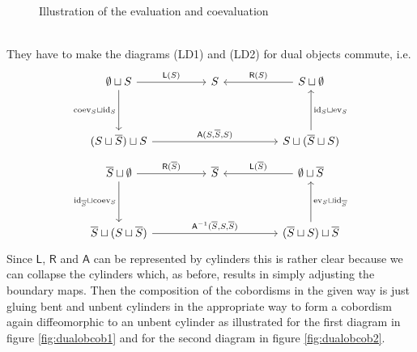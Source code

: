 \begin{prf}[Sketch]
\begin{figure}[h!]
\caption{Illustration of the evaluation and coevaluation}
\label{fig:evcoev}
\end{figure}
\\
They have to make the diagrams (LD1) and (LD2) for dual objects commute, i.e.
\begin{equation*}
\begin{tikzcd}
  \emptyset \sqcup S
  \ar{rr}{\mathsf{L}(S)}
  \ar{dd}[swap]{\mathrm{coev}_{S} \sqcup \mathrm{id}_{S}}
  &
  &
  S
  &
  &
  S \sqcup \emptyset
  \ar{ll}[swap]{\mathsf{R}(S)}
  \\
  \\
  (S \sqcup \overline{S}) \sqcup S
  \ar{rrrr}{\mathsf{A}(S,\overline{S},S)}
  &
  &
  &
  &
  S \sqcup (\overline{S} \sqcup S)
  \ar{uu}[swap]{\mathrm{id}_{S} \sqcup \mathrm{ev}_{S}}
\end{tikzcd}
\end{equation*}
\begin{equation*}
\begin{tikzcd}
  \overline{S} \sqcup \emptyset
  \ar{rr}{\mathsf{R}(\overline{S})}
  \ar{dd}[swap]{\mathrm{id}_{\overline{S}} \sqcup \mathrm{coev}_{S}}
  &
  &
  \overline{S}
  &
  &
  \emptyset \sqcup \overline{S}
  \ar{ll}[swap]{\mathsf{L}(\overline{S})}
  \\
  \\
  \overline{S} \sqcup (S \sqcup \overline{S})
  \ar{rrrr}{\mathsf{A}^{-1}(\overline{S},S,\overline{S})}
  &
  &
  &
  &
  (\overline{S} \sqcup S) \sqcup \overline{S}
  \ar{uu}[swap]{\mathrm{ev}_{S} \sqcup \mathrm{id}_{\overline{S}}}
\end{tikzcd}
\end{equation*}
Since $\mathsf{L}$, $\mathsf{R}$ and $\mathsf{A}$ can be represented by cylinders this is rather clear because we can collapse the cylinders which, as before, results in simply adjusting the boundary maps. Then the composition of the cobordisms in the given way is just gluing bent and unbent cylinders in the appropriate way to form a cobordism again diffeomorphic to an unbent cylinder as illustrated for the first diagram in figure \ref{fig:dualobcob1} and for the second diagram in figure \ref{fig:dualobcob2}.

\end{prf}
